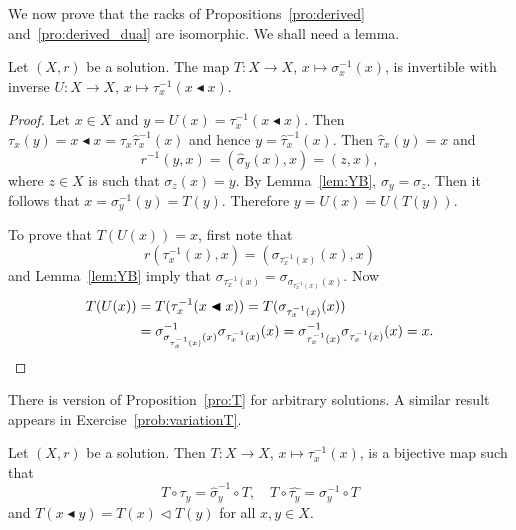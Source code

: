 We now prove that the racks 
of Propositions~\ref{pro:derived} 
and~\ref{pro:derived_dual} are isomorphic. 
We shall need a lemma. 



\begin{lemma}
\label{lem:T_invertible}
Let $(X,r)$ be a solution. 
The map $T\colon X\to X$, $x\mapsto\sigma_x^{-1}(x)$, is invertible with
inverse $U\colon X\to X$, $x\mapsto\tau^{-1}_x(x\blacktriangleleft x)$. 
\end{lemma}

\begin{proof}
Let $x\in X$ and $y=U(x)=\tau^{-1}_x(x\blacktriangleleft x)$. 
Then $\tau_x(y)=x\blacktriangleleft x=\tau_x\widehat{\tau}^{-1}_x(x)$ and hence
$y=\widehat{\tau}^{-1}_x(x)$. Then $\widehat{\tau}_x(y)=x$ and 
\[
r^{-1}(y,x)=(\widehat{\sigma}_y(x),x)=(z,x),
\]
where $z\in X$ is such that $\sigma_z(x)=y$. By Lemma~\ref{lem:YB}, $\sigma_y=\sigma_z$. Then 
it follows that $x=\sigma^{-1}_y(y)=T(y)$. Therefore $y=U(x)=U(T(y))$.

To prove that $T(U(x))=x$, first note that 
\[
r(\tau^{-1}_x(x),x)=(\sigma_{\tau^{-1}_x(x)}(x),x)
\]
and Lemma~\ref{lem:YB} imply that $\sigma_{\tau^{-1}_x(x)}=\sigma_{\sigma_{\tau^{-1}_x(x)}(x)}$. Now
\begin{align*}
T(U(x))&=T(\tau^{-1}_x(x\blacktriangleleft x))=T(\sigma_{\tau^{-1}_x(x)}(x))\\
&=\sigma^{-1}_{\sigma_{\tau^{-1}_x(x)}(x)}\sigma_{\tau^{-1}_x(x)}(x)
=\sigma^{-1}_{\tau^{-1}_x(x)}\sigma_{\tau^{-1}_x(x)}(x)=x.\qedhere
\end{align*}
\end{proof}

There is version of Proposition~\ref{pro:T} for arbitrary solutions. 
A similar result appears in Exercise~\ref{prob:variationT}.



\begin{proposition}
    Let $(X,r)$ be a solution. Then $T\colon X\to X$, $x\mapsto\tau_x^{-1}(x)$, is a bijective
    map such that 
    \[
      T\circ\tau_y=\widehat{\sigma}^{-1}_y\circ T,
      \quad
      T\circ \widehat{\tau_y}=\sigma^{-1}_{y}\circ T
    \]
    and $T(x\blacktriangleleft y)=T(x)\triangleleft T(y)$ for all $x,y\in X$. 
\end{proposition}

